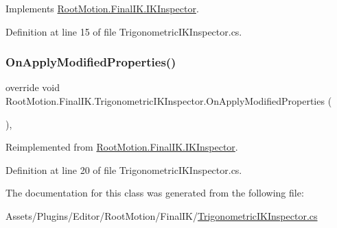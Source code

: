 Implements \mbox{\hyperlink{class_root_motion_1_1_final_i_k_1_1_i_k_inspector_a4c4528d5f5ce9af9e30c049138a5a5ca}{Root\+Motion.\+Final\+I\+K.\+I\+K\+Inspector}}.



Definition at line 15 of file Trigonometric\+I\+K\+Inspector.\+cs.

\mbox{\label{class_root_motion_1_1_final_i_k_1_1_trigonometric_i_k_inspector_a164e4136ae40980590ea2d284d10a1e8}} 
\subsubsection{\texorpdfstring{On\+Apply\+Modified\+Properties()}{OnApplyModifiedProperties()}}
{\footnotesize\ttfamily override void Root\+Motion.\+Final\+I\+K.\+Trigonometric\+I\+K\+Inspector.\+On\+Apply\+Modified\+Properties (\begin{DoxyParamCaption}{ }\end{DoxyParamCaption})\hspace{0.3cm}{\ttfamily [protected]}, {\ttfamily [virtual]}}



Reimplemented from \mbox{\hyperlink{class_root_motion_1_1_final_i_k_1_1_i_k_inspector_a2909376aa17c40b7d7577761165d1c67}{Root\+Motion.\+Final\+I\+K.\+I\+K\+Inspector}}.



Definition at line 20 of file Trigonometric\+I\+K\+Inspector.\+cs.



The documentation for this class was generated from the following file\+:\begin{DoxyCompactItemize}
\item 
Assets/\+Plugins/\+Editor/\+Root\+Motion/\+Final\+I\+K/\mbox{\hyperlink{_trigonometric_i_k_inspector_8cs}{Trigonometric\+I\+K\+Inspector.\+cs}}\end{DoxyCompactItemize}
